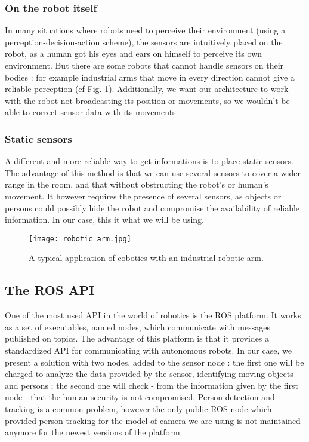 \documentclass[smallextended]{svjour3}
\begin{document}
\subsubsection{On the robot itself}

In many situations where robots need to perceive their environment (using a perception-decision-action scheme), the sensors are intuitively placed on the robot, as a human got his eyes and ears on himself to perceive its own environment. But there are some robots that cannot handle sensors on their bodies : for example industrial arms that move in every direction cannot give a reliable perception (cf Fig. \ref{fig:robotic_arm}). Additionally, we want our architecture to work with the robot not broadcasting its position or movements, so we wouldn't be able to correct sensor data with its movements.

\subsubsection{Static sensors}

A different and more reliable way to get informations is to place static sensors. The advantage of this method is that we can use several sensors to cover a wider range in the room, and that without obstructing the robot's or human's movement. It however requires the presence of several sensors, as objects or persons could possibly hide the robot and compromise the availability of reliable information. In our case, this it what we will be using.


\begin{figure}
\centering
\texttt{[image: robotic\_arm.jpg]}
\caption{\label{fig:robotic_arm}A typical application of cobotics with an industrial robotic arm.}
\end{figure}

\subsection{The ROS API}

One of the most used API in the world of robotics is the ROS platform. It works as a set of executables, named nodes, which communicate with messages published on topics. The advantage of this platform is that it provides a standardized API for communicating with autonomous robots. In our case, we present a solution with two nodes, added to the sensor node : the first one will be charged to analyze the data provided by the sensor, identifying moving objects and persons ; the second one will check - from the information given by the first node - that the human security is not compromised.
Person detection and tracking is a common problem, however the only public ROS node which provided person tracking for the model of camera we are using is not maintained anymore for the newest versions of the platform.
\end{document}

